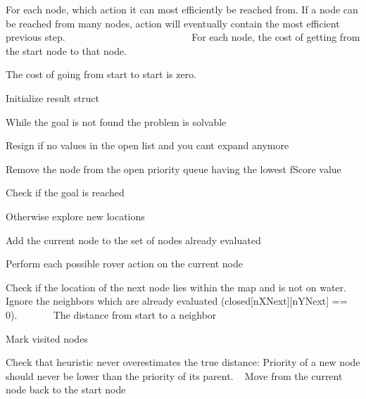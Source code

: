 For each node, which action it can most efficiently be reached from. If a node can be reached from many nodes, action will eventually contain the most efficient previous step. ~\newline
~\newline
~\newline
~\newline
~\newline
~\newline
~\newline
~\newline
~\newline
~\newline
~\newline
~\newline
~\newline
~\newline
~\newline
 For each node, the cost of getting from the start node to that node.

The cost of going from start to start is zero.

Initialize result struct

While the goal is not found the problem is solvable

Resign if no values in the open list and you can\textquotesingle{}t expand anymore

Remove the node from the open priority queue having the lowest f\+Score value

Check if the goal is reached

Otherwise explore new locations

Add the current node to the set of nodes already evaluated

Perform each possible rover action on the current node

Check if the location of the next node lies within the map and is not on water. Ignore the neighbors which are already evaluated (closed\mbox{[}n\+X\+Next\mbox{]}\mbox{[}n\+Y\+Next\mbox{]} == 0). ~\newline
~\newline
~\newline
~\newline
 The distance from start to a neighbor

Mark visited nodes

Check that heuristic never overestimates the true distance\+: Priority of a new node should never be lower than the priority of its parent. ~\newline
 Move from the current node back to the start node 

